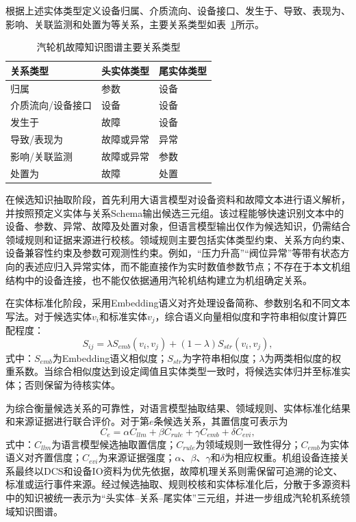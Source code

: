 根据上述实体类型定义设备归属、介质流向、设备接口、发生于、导致、表现为、影响、关联监测和处置为等关系，主要关系类型如表~\ref{tab:kg_relation_types_v6}所示。

\begin{table}[htbp]
    \centering
    \caption{汽轮机故障知识图谱主要关系类型}
    \label{tab:kg_relation_types_v6}
    \begin{tabular}{lll}
        \toprule
        关系类型 & 头实体类型 & 尾实体类型 \\
        \midrule
        归属 & 参数 & 设备 \\
        介质流向/设备接口 & 设备 & 设备 \\
        发生于 & 故障 & 设备 \\
        导致/表现为 & 故障或异常 & 异常 \\
        影响/关联监测 & 故障或异常 & 参数 \\
        处置为 & 故障 & 处置 \\
        \bottomrule
    \end{tabular}
\end{table}

在候选知识抽取阶段，首先利用大语言模型对设备资料和故障文本进行语义解析，并按照预定义实体与关系Schema输出候选三元组。该过程能够快速识别文本中的设备、参数、异常、故障及处置对象，但语言模型输出仅作为候选知识，仍需结合领域规则和证据来源进行校核。领域规则主要包括实体类型约束、关系方向约束、设备兼容性约束及参数可观测性约束。例如，“压力升高”“阀位异常”等带有状态方向的表述应归入异常实体，而不能直接作为实时数值参数节点；不存在于本文机组结构中的设备连接，也不能仅依据通用汽轮机结构建立为机组确定关系。

在实体标准化阶段，采用Embedding语义对齐处理设备简称、参数别名和不同文本写法\cite{Reimers2019SentenceBERT}。对于候选实体$v_i$和标准实体$v_j$，综合语义向量相似度和字符串相似度计算匹配程度：
\begin{equation}
S_{ij}=\lambda S_{emb}(v_i,v_j)+(1-\lambda)S_{str}(v_i,v_j),
\end{equation}
式中：$S_{emb}$为Embedding语义相似度；$S_{str}$为字符串相似度；$\lambda$为两类相似度的权重系数。当综合相似度达到设定阈值且实体类型一致时，将候选实体归并至标准实体；否则保留为待核实体。

为综合衡量候选关系的可靠性，对语言模型抽取结果、领域规则、实体标准化结果和来源证据进行联合评价。对于第$e$条候选关系，其置信度可表示为
\begin{equation}
C_e=\alpha C_{llm}+\beta C_{rule}+\gamma C_{emb}+\delta C_{evi},
\end{equation}
式中：$C_{llm}$为语言模型候选抽取置信度；$C_{rule}$为领域规则一致性得分；$C_{emb}$为实体语义对齐置信度；$C_{evi}$为来源证据强度；$\alpha$、$\beta$、$\gamma$和$\delta$为相应权重。机组设备连接关系最终以DCS和设备IO资料为优先依据，故障机理关系则需保留可追溯的论文、标准或运行事件来源。经过候选抽取、规则校核和实体标准化后，分散于多源资料中的知识被统一表示为“头实体--关系--尾实体”三元组，并进一步组成汽轮机系统领域知识图谱。

